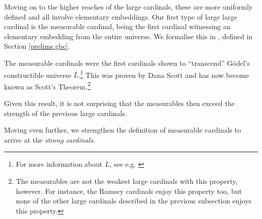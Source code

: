 \documentclass[../../main]{subfiles}
\begin{document}
Moving on to the higher reaches of the large cardinals, these are more uniformly defined and all involve elementary embeddings. Our first type of large large cardinal is the measurable cardinal, being the first cardinal witnessing an elementary embedding from the entire universe. We formalise this in \gbc, defined in Section \ref{prelims.gbc}.


The measurable cardinals were the first cardinals shown to ``transcend'' G\"odel's constructible universe $L$.\footnote{For more information about $L$, see e.g. \cite{SchindlerBook}} This was proven by Dana Scott and has now become known as Scott's Theorem.\footnote{The measurables are not the weakest large cardinals with this property, however. For instance, the Ramsey cardinals enjoy this property too, but none of the other large cardinals described in the previous subsection enjoys this property.}


Given this result, it is not surprising that the measurables then exceed the strength of the previous large cardinals.


Moving even further, we strengthen the definition of measurable cardinals to arrive at the \textit{strong cardinals}.

\end{document}
